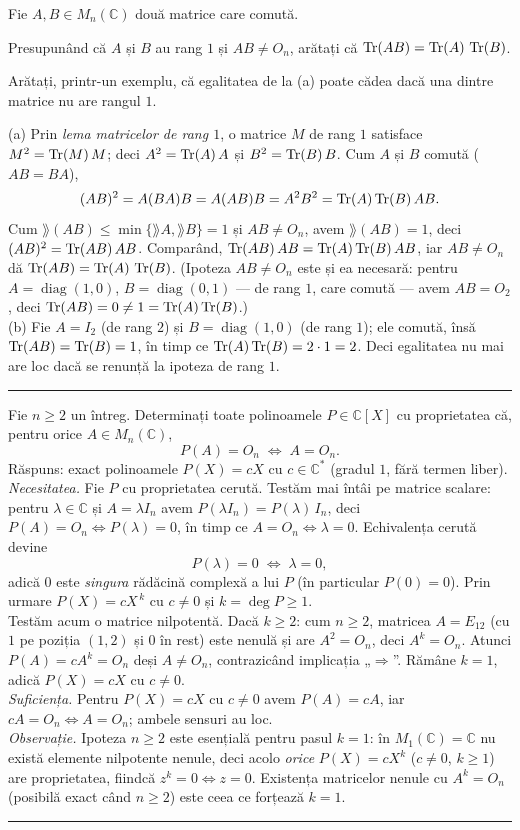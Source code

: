Fie $A,B\in M_n(\mathbb{C})$ două matrice care comută.
\begin{parti}
  \item Presupunând că $A$ și $B$ au rang $1$ și $AB\neq O_n$, arătați că $\operatorname{Tr}(AB)=\operatorname{Tr}(A)\,\operatorname{Tr}(B)$.
  \item Arătați, printr-un exemplu, că egalitatea de la (a) poate cădea dacă una dintre matrice nu are rangul $1$.
\end{parti}
\sol (a) Prin \emph{lema matricelor de rang $1$}, o matrice $M$ de rang $1$ satisface $M^2=\operatorname{Tr}(M)\,M$; deci $A^2=\operatorname{Tr}(A)\,A$ și $B^2=\operatorname{Tr}(B)\,B$. Cum $A$ și $B$ comută ($AB=BA$),
\[ (AB)^2=A(BA)B=A(AB)B=A^2B^2=\operatorname{Tr}(A)\operatorname{Tr}(B)\,AB. \]
Cum $\rang(AB)\le\min\{\rang A,\rang B\}=1$ și $AB\neq O_n$, avem $\rang(AB)=1$, deci $(AB)^2=\operatorname{Tr}(AB)\,AB$. Comparând, $\operatorname{Tr}(AB)\,AB=\operatorname{Tr}(A)\operatorname{Tr}(B)\,AB$, iar $AB\neq O_n$ dă $\operatorname{Tr}(AB)=\operatorname{Tr}(A)\,\operatorname{Tr}(B)$. (Ipoteza $AB\neq O_n$ este și ea necesară: pentru $A=\operatorname{diag}(1,0)$, $B=\operatorname{diag}(0,1)$ --- de rang $1$, care comută --- avem $AB=O_2$, deci $\operatorname{Tr}(AB)=0\neq1=\operatorname{Tr}(A)\operatorname{Tr}(B)$.)\\[2pt]
(b) Fie $A=I_2$ (de rang $2$) și $B=\operatorname{diag}(1,0)$ (de rang $1$); ele comută, însă $\operatorname{Tr}(AB)=\operatorname{Tr}(B)=1$, în timp ce $\operatorname{Tr}(A)\operatorname{Tr}(B)=2\cdot1=2$. Deci egalitatea nu mai are loc dacă se renunță la ipoteza de rang $1$.
\vspace{1mm}\hrule

Fie $n\ge2$ un întreg. Determinați toate polinoamele $P\in\mathbb{C}[X]$ cu proprietatea că, pentru orice $A\in M_n(\mathbb{C})$,
\[ P(A)=O_n \;\Longleftrightarrow\; A=O_n. \]
\sol Răspuns: exact polinoamele $P(X)=cX$ cu $c\in\mathbb{C}^{*}$ (gradul $1$, fără termen liber).\\[2pt]
\emph{Necesitatea.} Fie $P$ cu proprietatea cerută. Testăm mai întâi pe matrice scalare: pentru $\lambda\in\mathbb{C}$ și $A=\lambda I_n$ avem $P(\lambda I_n)=P(\lambda)\,I_n$, deci $P(A)=O_n\Leftrightarrow P(\lambda)=0$, în timp ce $A=O_n\Leftrightarrow\lambda=0$. Echivalența cerută devine
\[ P(\lambda)=0 \;\Longleftrightarrow\; \lambda=0, \]
adică $0$ este \emph{singura} rădăcină complexă a lui $P$ (în particular $P(0)=0$). Prin urmare $P(X)=cX^{\,k}$ cu $c\neq0$ și $k=\deg P\ge1$.\\[2pt]
Testăm acum o matrice nilpotentă. Dacă $k\ge2$: cum $n\ge2$, matricea $A=E_{12}$ (cu $1$ pe poziția $(1,2)$ și $0$ în rest) este nenulă și are $A^2=O_n$, deci $A^k=O_n$. Atunci $P(A)=cA^{k}=O_n$ deși $A\neq O_n$, contrazicând implicația „$\Rightarrow$''. Rămâne $k=1$, adică $P(X)=cX$ cu $c\neq0$.\\[2pt]
\emph{Suficiența.} Pentru $P(X)=cX$ cu $c\neq0$ avem $P(A)=cA$, iar $cA=O_n\Leftrightarrow A=O_n$; ambele sensuri au loc.\\[2pt]
\emph{Observație.} Ipoteza $n\ge2$ este esențială pentru pasul $k=1$: în $M_1(\mathbb{C})=\mathbb{C}$ nu există elemente nilpotente nenule, deci acolo \emph{orice} $P(X)=cX^{k}$ ($c\neq0$, $k\ge1$) are proprietatea, fiindcă $z^k=0\Leftrightarrow z=0$. Existența matricelor nenule cu $A^k=O_n$ (posibilă exact când $n\ge2$) este ceea ce forțează $k=1$.
\vspace{1mm}\hrule


